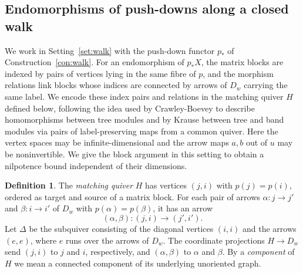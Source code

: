 \documentclass[a4paper,reqno,10pt]{amsart}
\theoremstyle{definition}
\newtheorem{definition}[theorem]{Definition}
\numberwithin{equation}{section}
\begin{document}
\subsection{Endomorphisms of push-downs along a closed walk}
\label{sec:matching}
We work in Setting~\ref{set:walk} with the push-down functor $p_*$ of
Construction~\ref{con:walk}.
For an endomorphism of $p_*X$, the matrix blocks are indexed by pairs of
vertices lying in the same fibre of $p$, and the morphism relations link blocks
whose indices are connected by arrows of $D_w$ carrying the same label. We encode these index pairs and
relations in the matching quiver $H$ defined below, following the idea used by Crawley-Boevey
\cite[Theorem in \S2]{CrawleyBoeveyMaps} to describe homomorphisms between
tree modules and by Krause \cite[Theorem, p.~191]{KrauseTreeBand} between
tree and band modules via pairs of label-preserving maps from a common
quiver. Here the vertex spaces may be infinite-dimensional and the arrow maps $a,b$ out of $u$ may be noninvertible. We give the block argument in
this setting to obtain a nilpotence bound independent of their dimensions.

\begin{definition}\label{def:matching-quiver}
The \emph{matching quiver} $H$ has vertices $(j,i)$ with $p(j)=p(i)$,
ordered as target and source of a matrix block.
For each pair of arrows $\alpha:j\to j'$ and $\beta:i\to i'$ of $D_w$
with $p(\alpha)=p(\beta)$, it has an arrow
\[
 (\alpha,\beta):(j,i)\longrightarrow(j',i').
\]
Let $\Delta$ be the subquiver consisting of the diagonal vertices
$(i,i)$ and the arrows $(e,e)$, where $e$ runs over the arrows of $D_w$.
The coordinate projections $H\to D_w$ send $(j,i)$ to $j$ and $i$,
respectively, and $(\alpha,\beta)$ to $\alpha$ and $\beta$.
By a \emph{component} of $H$ we mean a connected component of its underlying unoriented graph.
\end{definition}
\end{document}
